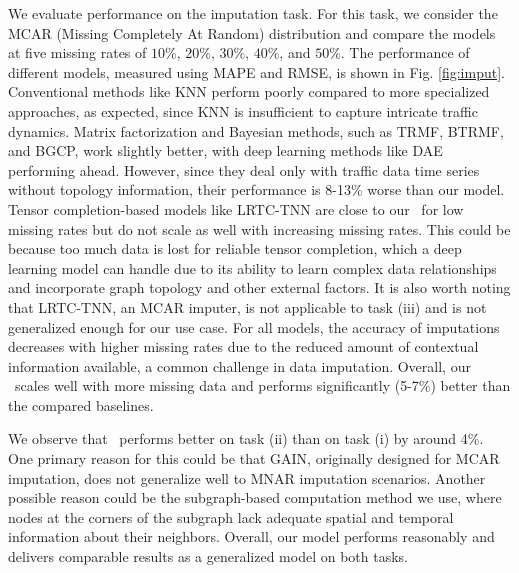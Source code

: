 We evaluate performance on the imputation task. For this task, we consider the MCAR (Missing Completely At Random) distribution and compare the models at five missing rates of $10\%$, $20\%$, $30\%$, $40\%$, and $50\%$. The performance of different models, measured using MAPE and RMSE, is shown in Fig. \ref{fig:imput}. Conventional methods like KNN perform poorly compared to more specialized approaches, as expected, since KNN is insufficient to capture intricate traffic dynamics. Matrix factorization and Bayesian methods, such as TRMF, BTRMF, and BGCP, work slightly better, with deep learning methods like DAE performing ahead. However, since they deal only with traffic data time series without topology information, their performance is 8-13\% worse than our model. Tensor completion-based models like LRTC-TNN are close to our \name\ for low missing rates but do not scale as well with increasing missing rates. This could be because too much data is lost for reliable tensor completion, which a deep learning model can handle due to its ability to learn complex data relationships and incorporate graph topology and other external factors. It is also worth noting that LRTC-TNN, an MCAR imputer, is not applicable to task (iii) and is not generalized enough for our use case. For all models, the accuracy of imputations decreases with higher missing rates due to the reduced amount of contextual information available, a common challenge in data imputation. Overall, our \name\ scales well with more missing data and performs significantly (5-7\%) better than the compared baselines.

We observe that \name\ performs better on task (ii) than on task (i) by around 4\%. One primary reason for this could be that GAIN, originally designed for MCAR imputation, does not generalize well to MNAR imputation scenarios. Another possible reason could be the subgraph-based computation method we use, where nodes at the corners of the subgraph lack adequate spatial and temporal information about their neighbors. Overall, our model performs reasonably and delivers comparable results as a generalized model on both tasks.

